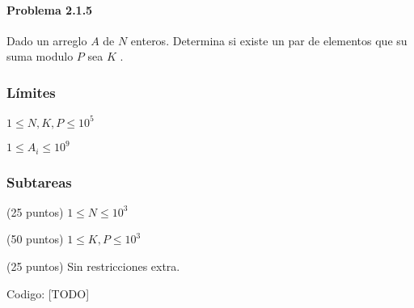 \problembreak

\paragraph{Problema 2.1.5} Dado un arreglo \(A\) de \(N\) enteros. Determina si existe un par de elementos que su suma modulo \(P\) sea \(K\) .

\subsubsection*{Límites}
\begin{plimits}
	\item \(1\leq N,K,P\leq 10^5 \)
	\item \(1\leq A_i\leq 10^9 \)
\end{plimits}

\subsubsection*{Subtareas}
\begin{plimits}
	\item (25 puntos) \(1\leq N\leq 10^3 \)
	\item (50 puntos) \(1\leq K, P\leq 10^3 \)
	\item (25 puntos) Sin restricciones extra.
\end{plimits}

Codigo: [TODO]